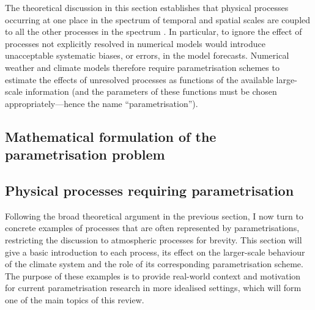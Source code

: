 \documentclass[titlepage]{article}
\numberwithin{equation}{section}
\begin{document}
The theoretical discussion in this section establishes that physical processes
occurring at one place in the spectrum of temporal and spatial scales are
coupled to all the other processes in the spectrum \parencite{franzke2015}. In
particular, to ignore the effect of processes not explicitly resolved in
numerical models would introduce unacceptable systematic biases, or errors, in
the model forecasts. Numerical weather and climate models therefore require
parametrisation schemes to estimate the effects of unresolved processes as
functions of the available large-scale information (and the parameters of these
functions must be chosen appropriately---hence the name ``parametrisation'').


\subsection{Mathematical formulation of the parametrisation problem}


\subsection{Physical processes requiring parametrisation}
Following the broad theoretical argument in the previous section, I now turn to
concrete examples of processes that are often represented by parametrisations,
restricting the discussion to atmospheric processes for brevity. This section
will give a basic introduction to each process, its effect on the larger-scale
behaviour of the climate system and the role of its corresponding
parametrisation scheme. The purpose of these examples is to provide real-world
context and motivation for current parametrisation research in more idealised
settings, which will form one of the main topics of this review.
\end{document}
